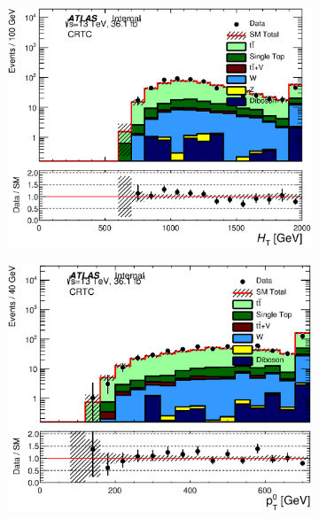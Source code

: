\begin{figure}[h!]
\begin{center}
\begin{subfigure}[b]{0.40\textwidth}
                \caption{ }
    \end{subfigure}
    \begin{subfigure}[b]{0.40\textwidth}    
    	 \includegraphics[width=\textwidth]{figures/plotRegion/Ht_CRTopC_log.eps}
                \caption{ }
    \end{subfigure}
    \begin{subfigure}[b]{0.40\textwidth}    
    	 \includegraphics[width=\textwidth]{figures/plotRegion/JetPt_0__CRTopC_log.eps}
                \caption{ }
    \end{subfigure}
    \begin{subfigure}[b]{0.40\textwidth}    

\end{subfigure}
\end{center}
\end{figure}
